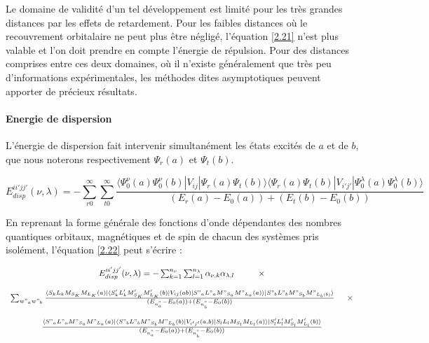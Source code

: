 	Le domaine de validité d'un tel développement est limité pour les très grandes distances par les effets de retardement. Pour les faibles distances où le recouvrement orbitalaire ne peut plus être négligé, l'équation \ref{2.21} n'est plus valable et l'on doit prendre en compte l'énergie de répulsion. Pour des distances comprises entre ces deux domaines, où il n'existe généralement que très peu d'informations expérimentales, les méthodes dites asymptotiques peuvent apporter de précieux résultats.
	
	
	\paragraph{Energie de dispersion}
	
	L'énergie de dispersion fait intervenir simultanément les états excités de $a$ et de $b$, que nous noterons respectivement $\Psi_{r}(a)$ et $\Psi_{t}(b)$.
	
	\begin{equation}
	E_{disp}^{ii'jj'} (\nu , \lambda) = - \sum_{r0}^{\infty} \sum_{t0}^{\infty} \frac{\langle \Psi_{0}^{\nu} (a) \Psi_{0}^{\nu} (b)| V_{ij}|\Psi_{r} (a) \Psi_{t} (b) \rangle  \langle \Psi_{r} (a) \Psi_{t} (b) |V_{i'j'}| \Psi_{0}^{\lambda} (a) \Psi_{0}^{\lambda}(b) \rangle}{(E_{r} (a) - E_{0} (a)) + (E_{t} (b) - E_{0} (b))} \label{2.22}
	\end{equation}
	
	En reprenant la forme générale des fonctions d'onde dépendantes des nombres quantiques orbitaux, magnétiques et de spin de chacun des systèmes pris isolément, l'équation \ref{2.22} peut s'écrire : 
	
	\begin{equation}
	\begin{array}{c}
	E_{disp}^{ii'jj'} (\nu , \lambda) = - \sum_{k=1}^{n_{\nu}} \sum_{l=1}^{n_{\lambda}} \alpha_{\nu , k} \alpha_{\lambda , l} \hspace{1cm} \times \\
	\\
	\sum_{w"_{a} w"_{b}} \frac{\langle S_{k} L_{k} M_{S_{K}} M_{L_{K}} (a) |\langle S'_{k} L'_{k} M'_{S_{K}} M'_{L_{K}} (b)| V_{ij} (ab) | S"_{a} L"_{a} M"_{S_{a}} M"_{L_{a}} (a)\rangle| S"_{b} L"_{b} M"_{S_{b}} M"_{L_{b}(b)} \rangle}{(E_{n_{a}^{"}} - E_{0}(a)) + (E_{n_{b}^{"}} - E_{0}(b))} \hspace{0.5 cm} \times \\
	\\
	\frac{\langle S"_{a} L"_{a} M"_{S_{a}} M"_{L_{a}} (a)| \langle S"_{b} L"_{b} M"_{S_{b}} M"_{L_{b}} (b) | V_{i'j'}(a,b)| S_{l} L_{l} M_{S_{l}} M_{L_{l}} (a) \rangle | S'_{l} L'_{l} M'_{S_{l}} M'_{L_{l}} (b) \rangle}{(E_{n_{a}^{"}} - E_{0} (a)) + (E_{n_{b}^{"}} - E_{0}(b))}
	\end{array}
	\end{equation}
	
